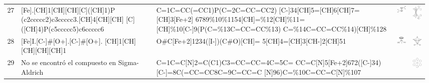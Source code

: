 \begin{landscape}
\begin{longtable}{m{0.3cm}m{6.7cm}m{7.7cm}m{2.3cm}m{2.3cm}}
 27 &
 [Fe].[CH]1[CH][CH][C]([CH]1)P (c2ccccc2)c3ccccc3.[CH]4[CH][CH] [C]([CH]4)P(c5ccccc5)c6ccccc6 & 
 C=1C=CC(=CC1)P(C=2C=CC=CC2) [C-]34[CH]5=[CH]6[CH]7=[CH]3[Fe+2] 6789\%10\%1154[CH]=\%12[CH]\%11= [CH]\%10[C-]9(P(C=\%13C=CC=CC\%13) C=\%14C=CC=CC\%14)[CH]\%128 & 
 \includegraphics[width=2.2cm]{imagenes/sigmaAldrich/DPPF.png} & 
 \includegraphics[width=2.2cm]{imagenes/sciFinder/pdf/DPPF.pdf} \\

 28 &
 [Fe]I.[C-]\#[O+].[C-]\#[O+]. [CH]1[CH][CH][CH][CH]1 & 
 O\#C[Fe+2]1234([I-])(C\#O)[CH]= 5[CH]4=[CH]3[CH-]2[CH]51 & 
 \includegraphics[width=2.2cm]{imagenes/sigmaAldrich/Dicarbonylcyclopentadienyliodoiron(II).png} & 
 \includegraphics[width=2.2cm]{imagenes/sciFinder/pdf/Dicarbonylcyclopentadienyliodoiron(II).pdf} \\

 29 &
 No se encontró el compuesto en Sigma-Aldrich & 
 C=1C=C[N]2=C(C1)C3=CC=CC=4C=5C= CC=C[N]5[Fe+2]672([C-]34)[C-]=8C(=CC=CC8C=9C=CC=C [N]96)C=\%10C=CC=C[N]\%107 & 
 & 
 \includegraphics[width=2.2cm]{imagenes/sciFinder/pdf/(OC-6-11)-Bis[2,6-di(2-pyridinyl-ÎºN)phenyl-ÎºC]iron.pdf}\\


\end{longtable}
\end{landscape}
